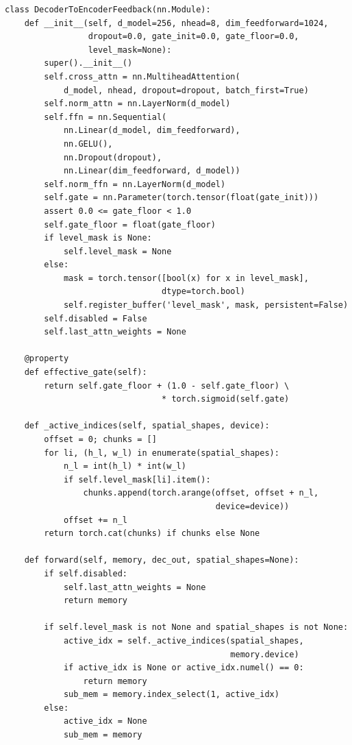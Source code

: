\begin{lstlisting}[caption={Core of \texttt{src/zoo/rtdetr/feedback\_module.py} (v2). The two structural changes from v1 are the \texttt{effective\_gate} property (gate floor) and the \texttt{level\_mask} branch in \texttt{forward} (subset of memory levels refined). The remaining lines are unchanged from v1.}, label={lst:feedback}]
class DecoderToEncoderFeedback(nn.Module):
    def __init__(self, d_model=256, nhead=8, dim_feedforward=1024,
                 dropout=0.0, gate_init=0.0, gate_floor=0.0,
                 level_mask=None):
        super().__init__()
        self.cross_attn = nn.MultiheadAttention(
            d_model, nhead, dropout=dropout, batch_first=True)
        self.norm_attn = nn.LayerNorm(d_model)
        self.ffn = nn.Sequential(
            nn.Linear(d_model, dim_feedforward),
            nn.GELU(),
            nn.Dropout(dropout),
            nn.Linear(dim_feedforward, d_model))
        self.norm_ffn = nn.LayerNorm(d_model)
        self.gate = nn.Parameter(torch.tensor(float(gate_init)))
        assert 0.0 <= gate_floor < 1.0
        self.gate_floor = float(gate_floor)
        if level_mask is None:
            self.level_mask = None
        else:
            mask = torch.tensor([bool(x) for x in level_mask],
                                dtype=torch.bool)
            self.register_buffer('level_mask', mask, persistent=False)
        self.disabled = False
        self.last_attn_weights = None

    @property
    def effective_gate(self):
        return self.gate_floor + (1.0 - self.gate_floor) \
                                * torch.sigmoid(self.gate)

    def _active_indices(self, spatial_shapes, device):
        offset = 0; chunks = []
        for li, (h_l, w_l) in enumerate(spatial_shapes):
            n_l = int(h_l) * int(w_l)
            if self.level_mask[li].item():
                chunks.append(torch.arange(offset, offset + n_l,
                                           device=device))
            offset += n_l
        return torch.cat(chunks) if chunks else None

    def forward(self, memory, dec_out, spatial_shapes=None):
        if self.disabled:
            self.last_attn_weights = None
            return memory

        if self.level_mask is not None and spatial_shapes is not None:
            active_idx = self._active_indices(spatial_shapes,
                                              memory.device)
            if active_idx is None or active_idx.numel() == 0:
                return memory
            sub_mem = memory.index_select(1, active_idx)
        else:
            active_idx = None
            sub_mem = memory


\end{lstlisting}
